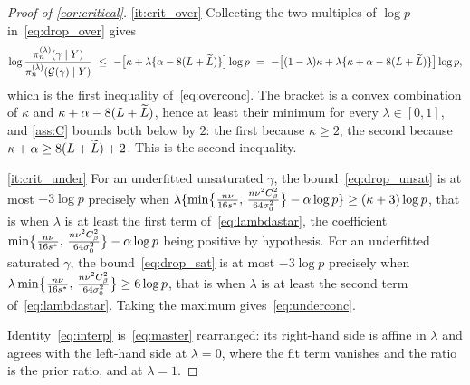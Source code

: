 \begin{proof}[Proof of \cref{cor:critical}]
    \ref{it:crit_over} Collecting the two multiples of $\log p$
    in~\eqref{eq:drop_over} gives
    \begin{equation*}
        \log\frac{\pi_n^{(\lambda)}(\gamma\mid Y)}
        {\pi_n^{(\lambda)}(\mathcal{G}(\gamma)\mid Y)}
        \ \leq\ -\bigl[\kappa+\lambda\{\alpha-8(L+\widetilde{L})\}\bigr]\log p
        \ =\ -\bigl[(1-\lambda)\kappa
        +\lambda\{\kappa+\alpha-8(L+\widetilde{L})\}\bigr]\log p ,
    \end{equation*}
    which is the first inequality of~\eqref{eq:overconc}. The bracket is a
    convex combination of $\kappa$ and $\kappa+\alpha-8(L+\widetilde{L})$, hence at
    least their minimum for every $\lambda\in[0,1]$, and \cref{ass:C}
    bounds both below by $2$: the first because $\kappa\geq2$, the second
    because $\kappa+\alpha\geq8(L+\widetilde{L})+2$. This is the second inequality.

    \ref{it:crit_under} For an underfitted unsaturated $\gamma$, the
    bound~\eqref{eq:drop_unsat} is at most $-3\log p$ precisely when
    $\lambda\{\min\bigl\{\tfrac{n\nu}{16s^{\ast}},\, \tfrac{n\nu^{2}C_\beta^{2}}{64\sigma_0^{2}}\bigr\}-\alpha\log p\}\geq(\kappa+3)\log p$, that is
    when $\lambda$ is at least the first term of~\eqref{eq:lambdastar}, the
    coefficient $\min\bigl\{\tfrac{n\nu}{16s^{\ast}},\, \tfrac{n\nu^{2}C_\beta^{2}}{64\sigma_0^{2}}\bigr\}-\alpha\log p$ being positive by
    hypothesis. For an underfitted saturated $\gamma$, the
    bound~\eqref{eq:drop_sat} is at most $-3\log p$ precisely when
    $\lambda\min\bigl\{\tfrac{n\nu}{16s^{\ast}},\, \tfrac{n\nu^{2}C_\beta^{2}}{64\sigma_0^{2}}\bigr\}\geq6\log p$, that is when $\lambda$ is at least the
    second term of~\eqref{eq:lambdastar}. Taking the maximum
    gives~\eqref{eq:underconc}.

    Identity~\eqref{eq:interp} is~\eqref{eq:master} rearranged: its
    right-hand side is affine in $\lambda$ and agrees with the left-hand
    side at $\lambda=0$, where the fit term vanishes and the ratio is the
    prior ratio, and at $\lambda=1$.
\end{proof}

